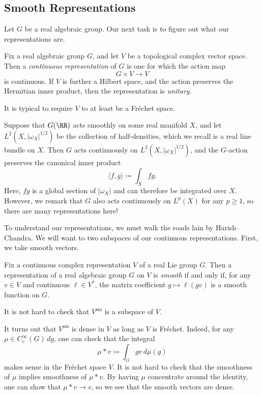 \documentclass[../notes.tex]{subfiles}
\begin{document}
\subsection{Smooth Representations}
Let $G$ be a real algebraic group. Our next task is to figure out what our representations are.
\begin{definition}
	Fix a real algebraic group $G$, and let $V$ be a topological complex vector space. Then a \textit{continuous representation} of $G$ is one for which the action map
	\[G\times V\to V\]
	is continuous. If $V$ is further a Hilbert space, and the action preserves the Hermitian inner product, then the representation is \textit{unitary}.
\end{definition}
\begin{remark}
	It is typical to require $V$ to at least be a Fr\'echet space.
\end{remark}
\begin{example}
	Suppose that $G(\RR)$ acts smoothly on some real manifold $X$, and let $L^2\left(X,\left|\omega_X\right|^{1/2}\right)$ be the collection of half-densities, which we recall is a real line bundle on $X$. Then $G$ acts continuously on $L^2\left(X,\left|\omega_X\right|^{1/2}\right)$, and the $G$-action preserves the canonical inner product
	\[\langle f,g\rangle\coloneqq\int_Xfg.\]
	Here, $fg$ is a global section of $\left|\omega_X\right|$ and can therefore be integrated over $X$. However, we remark that $G$ also acts continuously on $L^p(X)$ for any $p\ge1$, so there are many representations here!
\end{example}
To understand our representations, we must walk the roads lain by Harish--Chandra. We will want to two subspaces of our continuous representations. First, we take smooth vectors.
\begin{definition}[smooth]
	Fix a continuous complex representation $V$ of a real Lie group $G$. Then a representation of a real algebraic group $G$ on $V$ is \textit{smooth} if and only if, for any $v\in V$ and continuous $\ell\in V^*$, the matrix coefficient $g\mapsto\ell(gv)$ is a smooth function on $G$.
\end{definition}
\begin{remark}
	It is not hard to check that $V^{\mathrm{sm}}$ is a subspace of $V$.
\end{remark}
\begin{remark}
	It turns out that $V^{\mathrm{sm}}$ is dense in $V$ as long as $V$ is Fr\'echet. Indeed, for any $\mu\in C_c^\infty(G)\,dg$, one can check that the integral
	\[\mu*v\coloneqq\int_Ggv\,d\mu(g)\]
	makes sense in the Fr\'echet space $V$. It is not hard to check that the smoothness of $\mu$ implies smoothness of $\mu*v$. By having $\mu$ concentrate around the identity, one can show that $\mu*v\to v$, so we see that the smooth vectors are dense.
\end{remark}
\end{document}
